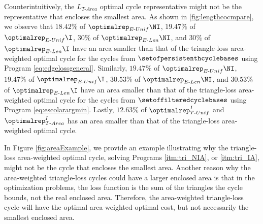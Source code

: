 Counterintuitively, the $L_{T\text{-}Area}$ optimal cycle representative might not be the representative that encloses the smallest area. As shown in \fig\ref{fig:lengthcocmpare}, we observe that $18.42\%$ of $\optimalrep_{E\text{-}Unif}\NI$, $19.47\%$ of $\optimalrep_{E\text{-}Unif}\I$, $30\%$ of $\optimalrep_{E\text{-}Len}\NI$, and $30\%$ of  $\optimalrep_{E\text{-}Len}\I$ have an area smaller than that of the triangle-loss area-weighted optimal cycle for the cycles from $\setofpersistenthcyclebases$ using Program \eqref{eq:edgelossgeneral}. 
Similarly,  $19.47\%$ of $\optimalrep_{E\text{-}Unif}\NI$, $19.47\%$ of  $\optimalrep_{E\text{-}Unif}\I$, $30.53\%$ of $\optimalrep_{E\text{-}Len}\NI$, and $30.53\%$ of $\optimalrep_{E\text{-}Len}\I$ have an area smaller than that of the triangle-loss area-weighted optimal cycle for the cycles from $\setoffilteredcyclebases$ using Program \eqref{eq:escolarargmin}. Lastly, $12.63\%$ of $\optimalrep^{I}_{T\text{-}Unif}$ and $\optimalrep^{I}_{T\text{-}Area}$ has an area smaller than that of the triangle-loss area-weighted optimal cycle.  %

In Figure \ref{fig:areaExample}, we provide an example illustrating why the triangle-loss area-weighted optimal cycle, solving Programs \ref{itm:tri_NIA}, or
\ref{itm:tri_IA}, might not be the cycle that encloses the smallest area. Another reason why the area-weighted triangle-loss cycles could have a larger enclosed area is that in the optimization problems, the loss function is the sum of the triangles the cycle bounds, not the real enclosed area. Therefore, the area-weighted triangle-loss cycle will have the optimal area-weighted optimal cost, but not necessarily the smallest enclosed area. 




